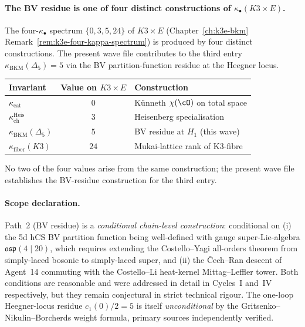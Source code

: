 \paragraph{The BV residue is one of four distinct constructions of
$\kappa_\bullet(K3 \times E)$.}

The four-$\kappa_\bullet$ spectrum $\{0, 3, 5, 24\}$ of $K3 \times E$
(Chapter~\ref{ch:k3e-bkm} Remark~\ref{rem:k3e-four-kappa-spectrum}) is
produced by four distinct constructions. The present wave file
contributes to the third entry $\kappa_{\mathrm{BKM}}(\Delta_5) = 5$
via the BV partition-function residue at the Heegner locus.

\begin{center}
\begin{tabular}{l|c|l}
Invariant & Value on $K3 \times E$ & Construction \\
\hline
$\kappa_{\mathrm{cat}}$ & $0$ & Künneth $\chi(\cO)$ on total space \\
$\kappa_{\mathrm{ch}}^{\mathrm{Heis}}$ & $3$ & Heisenberg specialisation \\
$\kappa_{\mathrm{BKM}}(\Delta_5)$ & $5$ & BV residue at $H_1$ (this wave) \\
$\kappa_{\mathrm{fiber}}(K3)$ & $24$ & Mukai-lattice rank of K3-fibre \\
\end{tabular}
\end{center}

No two of the four values arise from the same construction; the
present wave file establishes the BV-residue construction for the third
entry.

\paragraph{Scope declaration.}
Path~2 (BV residue) is a \emph{conditional chain-level construction}:
conditional on (i) the 5d hCS BV partition function being well-defined
with gauge super-Lie-algebra $\mathfrak{osp}(4 \mid 20)$, which requires
extending the Costello--Yagi all-orders theorem from simply-laced
bosonic to simply-laced super, and (ii) the Čech--Ran descent of
Agent~14 commuting with the Costello--Li heat-kernel Mittag--Leffler
tower. Both conditions are reasonable and were addressed in detail in
Cycles~I and~IV respectively, but they remain conjectural in strict
technical rigour. The one-loop Heegner-locus residue $c_1(0)/2 = 5$
is itself \emph{unconditional} by the Gritsenko--Nikulin--Borcherds
weight formula, primary sources independently verified.


